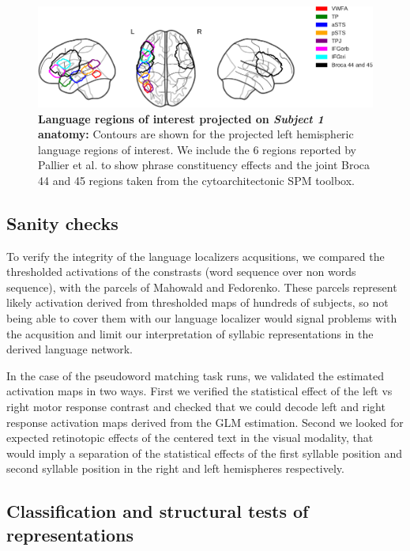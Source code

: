 \begin{figure}[hptb]
\centering
\includegraphics[width=1.0 \linewidth]{figures/part_II/language_example_img_with_legend.pdf}
\caption{\textbf{Language regions of interest projected on \emph{Subject 1} anatomy:}
Contours are shown for the projected left hemispheric language regions of interest. We include the 6 regions reported by Pallier et al. to show phrase constituency effects and the joint Broca 44 and 45 regions taken from the cytoarchitectonic SPM toolbox.
}
\label{fig:langrois_example_img}
\end{figure}


\subsection{Sanity checks}

To verify the integrity of the language localizers acqusitions, we compared the thresholded activations of the constrasts (word sequence over non words sequence), with the parcels of Mahowald and Fedorenko.
These parcels represent likely activation derived from thresholded maps of hundreds of subjects, so not being able to cover them with our language localizer would signal problems with the acqusition and limit our interpretation of syllabic representations in the derived language network.

In the case of the pseudoword matching task runs, we validated the estimated activation maps in two ways.
First we verified the statistical effect of the left vs right motor response contrast and checked that we could decode left and right response activation maps derived from the GLM estimation.
Second we looked for expected retinotopic effects of the centered text in the visual modality, that would imply a separation of the statistical effects of the first syllable position and second syllable position in the right and left hemispheres respectively.


\subsection{Classification and structural tests of representations}

